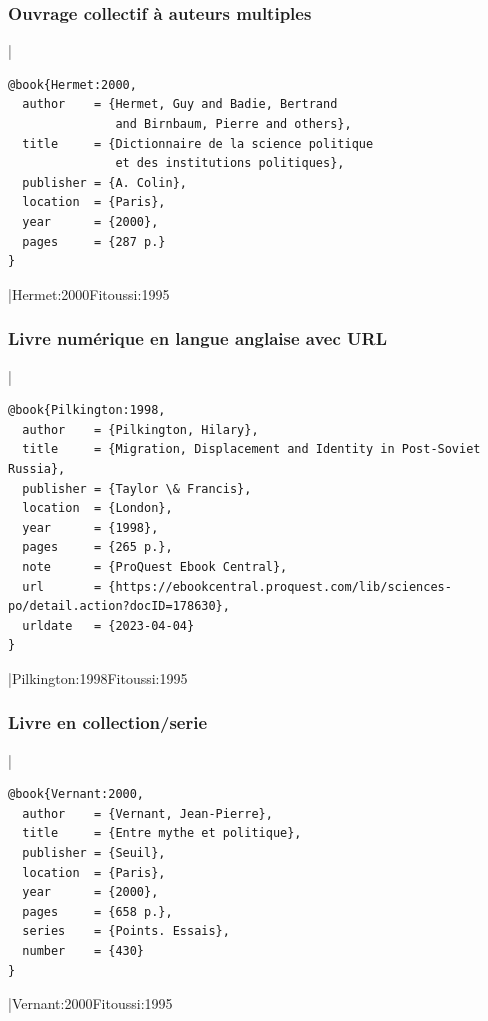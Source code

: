 \documentclass{article}
\begin{document}
\subsubsection{Ouvrage collectif à auteurs multiples}

|
\begin{verbatim}
@book{Hermet:2000,
  author    = {Hermet, Guy and Badie, Bertrand
               and Birnbaum, Pierre and others},
  title     = {Dictionnaire de la science politique
               et des institutions politiques},
  publisher = {A. Colin},
  location  = {Paris},
  year      = {2000},
  pages     = {287 p.}
}
\end{verbatim}
|{Hermet:2000}{Fitoussi:1995}

\subsubsection{Livre numérique en langue anglaise avec URL}

|
\begin{verbatim}
@book{Pilkington:1998,
  author    = {Pilkington, Hilary},
  title     = {Migration, Displacement and Identity in Post-Soviet Russia},
  publisher = {Taylor \& Francis},
  location  = {London},
  year      = {1998},
  pages     = {265 p.},
  note      = {ProQuest Ebook Central},
  url       = {https://ebookcentral.proquest.com/lib/sciences-po/detail.action?docID=178630},
  urldate   = {2023-04-04}
}
\end{verbatim}
|{Pilkington:1998}{Fitoussi:1995}

\subsubsection{Livre en collection/serie}

|
\begin{verbatim}
@book{Vernant:2000,
  author    = {Vernant, Jean-Pierre},
  title     = {Entre mythe et politique},
  publisher = {Seuil},
  location  = {Paris},
  year      = {2000},
  pages     = {658 p.},
  series    = {Points. Essais},
  number    = {430}
}
\end{verbatim}
|{Vernant:2000}{Fitoussi:1995}
\end{document}

